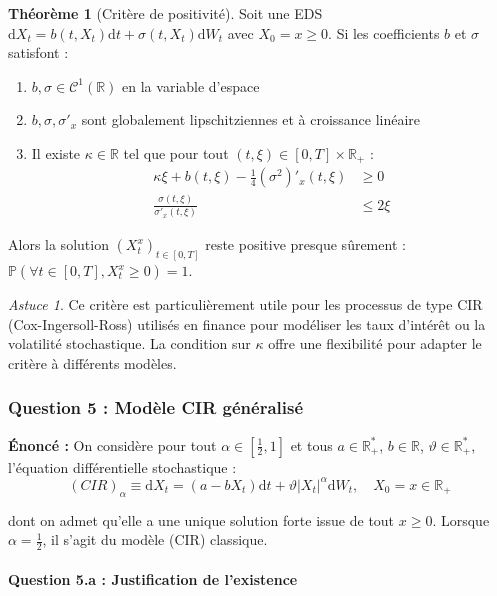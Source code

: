 \documentclass[12pt,a4paper]{article}
\theoremstyle{definition}
\newtheorem{theorem}{Théorème}[section]
\theoremstyle{remark}
\newtheorem*{astuce}{Astuce}
\newcommand{\R}{\mathbb{R}}
\newcommand{\Prob}{\mathbb{P}}
\newcommand{\dd}{\mathrm{d}}
\begin{document}
\begin{theorem}[Critère de positivité]
Soit une EDS $\dd X_t = b(t,X_t)\dd t + \sigma(t,X_t)\dd W_t$ avec $X_0 = x \geq 0$. Si les coefficients $b$ et $\sigma$ satisfont :
\begin{enumerate}[label=(\roman*)]
\item $b, \sigma \in \mathcal{C}^1(\R)$ en la variable d'espace
\item $b, \sigma, \sigma'_x$ sont globalement lipschitziennes et à croissance linéaire
\item Il existe $\kappa \in \R$ tel que pour tout $(t,\xi) \in [0,T] \times \R_+$ :
\begin{align*}
\kappa \xi + b(t,\xi) - \frac{1}{4}(\sigma^2)'_x(t,\xi) &\geq 0 \\
\frac{\sigma(t,\xi)}{\sigma'_x(t,\xi)} &\leq 2\xi
\end{align*}
\end{enumerate}

Alors la solution $(X_t^x)_{t \in [0,T]}$ reste positive presque sûrement : $\Prob(\forall t \in [0,T], X_t^x \geq 0) = 1$.
\end{theorem}

\begin{astuce}
Ce critère est particulièrement utile pour les processus de type CIR (Cox-Ingersoll-Ross) utilisés en finance pour modéliser les taux d'intérêt ou la volatilité stochastique. La condition sur $\kappa$ offre une flexibilité pour adapter le critère à différents modèles.
\end{astuce}

\subsubsection{Question 5 : Modèle CIR généralisé}

\textbf{Énoncé :} On considère pour tout $\alpha \in [\frac{1}{2}, 1]$ et tous $a \in \R_+^*$, $b \in \R$, $\vartheta \in \R_+^*$, l'équation différentielle stochastique :
\[
(CIR)_\alpha \equiv \dd X_t = (a - bX_t)\dd t + \vartheta|X_t|^\alpha \dd W_t, \quad X_0 = x \in \R_+
\]

dont on admet qu'elle a une unique solution forte issue de tout $x \geq 0$. Lorsque $\alpha = \frac{1}{2}$, il s'agit du modèle (CIR) classique.

\paragraph{Question 5.a : Justification de l'existence}
\end{document}
